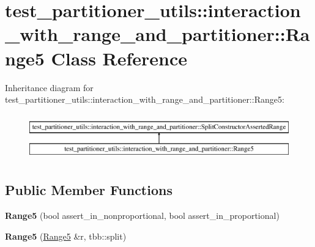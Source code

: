 \hypertarget{classtest__partitioner__utils_1_1interaction__with__range__and__partitioner_1_1Range5}{}\section{test\+\_\+partitioner\+\_\+utils\+:\+:interaction\+\_\+with\+\_\+range\+\_\+and\+\_\+partitioner\+:\+:Range5 Class Reference}
\label{classtest__partitioner__utils_1_1interaction__with__range__and__partitioner_1_1Range5}
Inheritance diagram for test\+\_\+partitioner\+\_\+utils\+:\+:interaction\+\_\+with\+\_\+range\+\_\+and\+\_\+partitioner\+:\+:Range5\+:\begin{figure}[H]
\begin{center}
\leavevmode
\includegraphics[height=2.000000cm]{classtest__partitioner__utils_1_1interaction__with__range__and__partitioner_1_1Range5}
\end{center}
\end{figure}
\subsection*{Public Member Functions}
\begin{DoxyCompactItemize}
\item 
\hypertarget{classtest__partitioner__utils_1_1interaction__with__range__and__partitioner_1_1Range5_ac22782a5d1c81de3f30868257d3aaf75}{}{\bfseries Range5} (bool assert\+\_\+in\+\_\+nonproportional, bool assert\+\_\+in\+\_\+proportional)\label{classtest__partitioner__utils_1_1interaction__with__range__and__partitioner_1_1Range5_ac22782a5d1c81de3f30868257d3aaf75}

\item 
\hypertarget{classtest__partitioner__utils_1_1interaction__with__range__and__partitioner_1_1Range5_af4ef675255df0219eb18488172901e3f}{}{\bfseries Range5} (\hyperlink{classtest__partitioner__utils_1_1interaction__with__range__and__partitioner_1_1Range5}{Range5} \&r, tbb\+::split)\label{classtest__partitioner__utils_1_1interaction__with__range__and__partitioner_1_1Range5_af4ef675255df0219eb18488172901e3f}

\end{DoxyCompactItemize}
